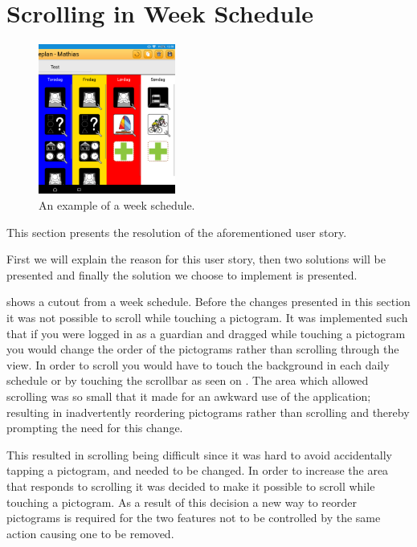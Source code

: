 \section{Scrolling in Week Schedule}
\begin{center}
\end{center}

\begin{figure}
    \centering
        \includegraphics[width=0.4\textwidth]{figures/img/screenshots/weekplan_schedule.png}
    \caption{An example of a week schedule.}\label{fig:weekschedule}
    \vspace{-20pt}
\end{figure}

This section presents the resolution of the aforementioned user story.

First we will explain the reason for this user story, then two solutions will be presented and finally the solution we choose to implement is presented.

 shows a cutout from a week schedule.
Before the changes presented in this section it was not possible to scroll while touching a pictogram.
It was implemented such that if you were logged in as a guardian and dragged while touching a pictogram you would change the order of the pictograms rather than scrolling through the view.
In order to scroll you would have to touch the background in each daily schedule or by touching the scrollbar as seen on .
The area which allowed scrolling was so small that it made for an awkward use of the application; resulting in inadvertently reordering pictograms rather than scrolling and thereby prompting the need for this change.

This resulted in scrolling being difficult since it was hard to avoid accidentally tapping a pictogram, and needed to be changed.
In order to increase the area that responds to scrolling  it was decided to make it possible to scroll while touching a pictogram.
As a result of this decision a new way to reorder pictograms is required for the two features not to be controlled by the same action causing one to be removed.

